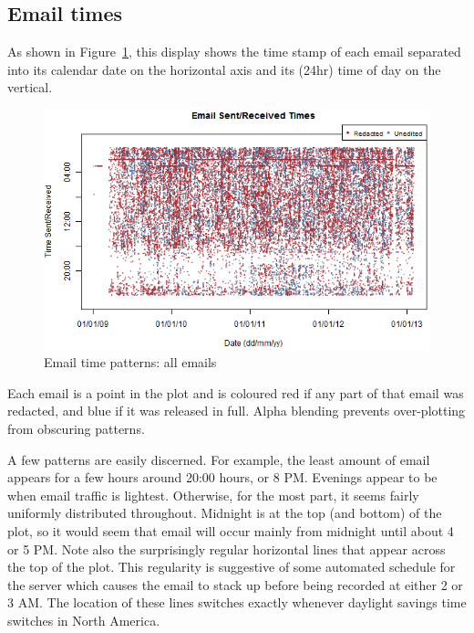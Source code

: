 \documentclass[journal]{vgtc}                %
\begin{document}
\subsection{Email times}
\label{sect:Displays:times}
As shown in Figure~\ref{fig:TimesAll}, this display shows the time stamp of each email separated into its calendar date on the horizontal axis and its (24hr) time of day on the vertical.  
\begin{figure}[h]
\begin{center}
\includegraphics[width=0.95\linewidth]{DailyFullTime}
\caption{Email time patterns: all emails}
\label{fig:TimesAll}
\end{center}
\end{figure}
Each email is a point in the plot and is coloured red if any part of that email was redacted, and blue if it was released in full.   Alpha blending prevents over-plotting from obscuring patterns.
 
A few patterns are easily discerned.  For example, the least amount of email appears for a few hours around  20:00 hours, or 8 PM.  Evenings appear to be when email traffic is lightest.  Otherwise, for the most part, it seems fairly uniformly distributed throughout.  Midnight is at the top (and bottom) of the plot, so it would seem that email will occur mainly from midnight until about 4 or 5 PM.   Note also the surprisingly regular horizontal lines that appear across the top of the plot.  This regularity is suggestive of some automated schedule for the server which causes the email to stack up before being recorded at either 2 or 3 AM.  The location of these lines switches exactly whenever daylight savings time switches in North America.  
\end{document}
